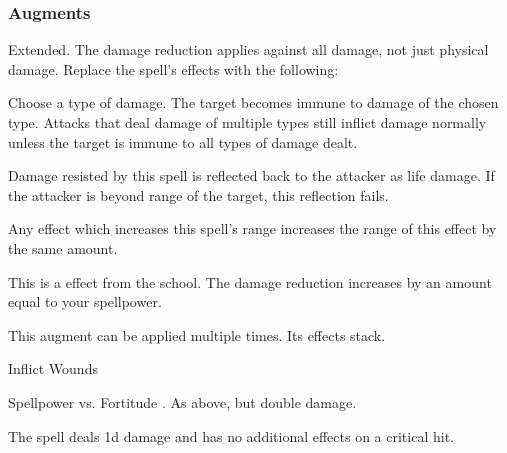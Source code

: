 \subsubsection{Augments}
 Extended.
The damage reduction applies against all damage, not just physical damage.
Replace
the spell's effects with the following:
\begin{augmenteffects}
\spelleffect
Choose a type of damage.
The target becomes immune to damage of the chosen type.
Attacks that deal damage of multiple types still inflict damage normally unless the target is immune to all types of damage dealt.
\end{augmenteffects}
Damage resisted by this spell is reflected back to the attacker as life damage.
If the attacker is beyond \rngclose range of the target, this reflection fails.
\par Any effect which increases this spell's range increases the range of this effect by the same amount.
\par
This is a  effect from the  school.
The damage reduction increases by an amount equal to your spellpower.
\par
This augment can be applied multiple times.
Its effects stack.
\begin{spellsection}{Inflict Wounds}
\begin{spellcontent}
\begin{spelltargetinginfo}
\end{spelltargetinginfo}
\begin{spelleffects}
\begin{spellattack}{Spellpower vs. Fortitude}
\spellsuccess {}.
\spellcritical As above, but double damage.
\end{spellattack}
\end{spelleffects}
\end{spellcontent}
\begin{spellfooter}
\miscastexplode
\end{spellfooter}
\begin{spellcantrip}
The spell deals \minus1d damage and has no additional effects on a critical hit.
\end{spellcantrip}
\end{spellsection}
